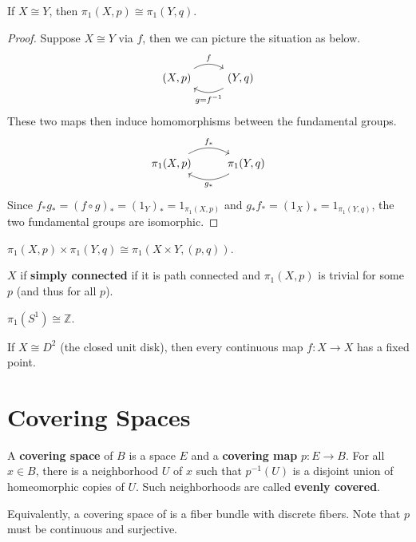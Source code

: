 \documentclass[twoside,10pt]{report}
\begin{document}
\begin{thrm}[]
	If $X \cong Y$, then $\pi_1(X,p) \cong \pi_1(Y,q)$.
\end{thrm}
\begin{proof}
	Suppose $X \cong Y$ via $f$, then we can picture the situation as below.
	\[
	\begin{tikzcd}
		(X,p)\arrow[r,"f",bend left]&(Y,q)\arrow[l,"g=f^{-1}",bend left]
	\end{tikzcd}
	\] 
	These two maps then induce homomorphisms between the fundamental groups.
	\[
        \begin{tikzcd}
                \pi_1(X,p)\arrow[r,"f_{*}",bend left]&\pi_1(Y,q)\arrow[l,"g_{*}",bend left]
        \end{tikzcd}
        \]
	Since $f_{*}g_{*}=(f\circ g)_{*}=(1_{Y})_{*}=1_{\pi_1(X,p)}$ and $g_{*}f_{*}=(1_{X})_{*}=1_{\pi_1(Y,q)}$, the two fundamental groups are isomorphic.
\end{proof}

\begin{prop}
	$\pi_1(X,p) \times \pi_1(Y,q) \cong \pi_1(X\times Y,(p,q))$.
\end{prop}

\begin{defn}[]
	$X$ if \textbf{simply connected} if it is path connected and $\pi_1(X,p)$ is trivial for some $p$ (and thus for all $p$).
\end{defn}

\begin{thrm}[]
	$\pi_1(S^{1})\cong \mathbb{Z}$.
\end{thrm}

\begin{thrm}
	If $X \cong D^{2}$ (the closed unit disk), then every continuous map $f:X\to X$ has a fixed point.
\end{thrm}



\section{Covering Spaces}

\begin{defn}[]
	A \textbf{covering space} of $B$ is a space $E$ and a \textbf{covering map} $p:E\to B$. For all $x \in B$, there is a neighborhood $U$ of $x$ such that $p^{-1}(U)$ is a disjoint union of homeomorphic copies of $U$. Such neighborhoods are called \textbf{evenly covered}.
\end{defn}
Equivalently, a covering space of is a fiber bundle with discrete fibers. Note that $p$ must be continuous and surjective.
\end{document}

